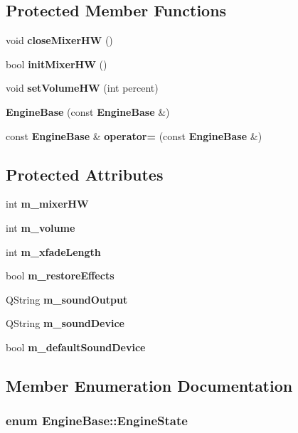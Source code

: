 \subsection*{Protected Member Functions}
\begin{CompactItemize}
\item 
void {\bf close\-Mixer\-HW} ()
\item 
bool {\bf init\-Mixer\-HW} ()
\item 
void {\bf set\-Volume\-HW} (int percent)
\item 
{\bf Engine\-Base} (const {\bf Engine\-Base} \&)
\item 
const {\bf Engine\-Base} \& {\bf operator=} (const {\bf Engine\-Base} \&)
\end{CompactItemize}
\subsection*{Protected Attributes}
\begin{CompactItemize}
\item 
int {\bf m\_\-mixer\-HW}
\item 
int {\bf m\_\-volume}
\item 
int {\bf m\_\-xfade\-Length}
\item 
bool {\bf m\_\-restore\-Effects}
\item 
QString {\bf m\_\-sound\-Output}
\item 
QString {\bf m\_\-sound\-Device}
\item 
bool {\bf m\_\-default\-Sound\-Device}
\end{CompactItemize}


\subsection{Member Enumeration Documentation}
\subsubsection{\setlength{\rightskip}{0pt plus 5cm}enum {\bf Engine\-Base::Engine\-State}}\label{classEngineBase_EngineBasew7}


